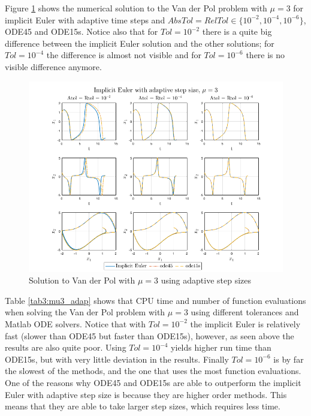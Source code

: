 Figure \ref{fig3:adap_mu3} shows the numerical solution to the Van der Pol problem with $\mu = 3$ for implicit Euler with adaptive time steps and $AbsTol=RelTol \in \{10^{-2}, 10^{-4}, 10^{-6}\}$, ODE45 and ODE15s. Notice also that for $Tol = 10^{-2}$ there is a quite big difference between the implicit Euler solution and the other solutions; for $Tol = 10^{-4}$ the difference is almost not visible and for $Tol = 10^{-6}$ there is no visible difference anymore.

\begin{figure}[H]
    \centering
    \includegraphics[width=\textwidth]{graphics/opg3/mu3_adap.png}
    \caption{Solution to Van der Pol with $\mu = 3$ using adaptive step sizes}
    \label{fig3:adap_mu3}
\end{figure}

Table \ref{tab3:mu3_adap} shows that CPU time and number of function evaluations when solving the Van der Pol problem with $\mu = 3$ using different tolerances and Matlab ODE solvers. Notice that with $Tol = 10^{-2}$ the implicit Euler is relatively fast (slower than ODE45 but faster than ODE15s), however, as seen above the results are also quite poor. Using $Tol = 10^{-4}$ yields higher run time than ODE15s, but with very little deviation in the results. Finally $Tol = 10^{-6}$ is by far the slowest of the methods, and the one that uses the most function evaluations. One of the reasons why ODE45 and ODE15s are able to outperform the implicit Euler with adaptive step size is because they are higher order methods. This means that they are able to take larger step sizes, which requires less time.

